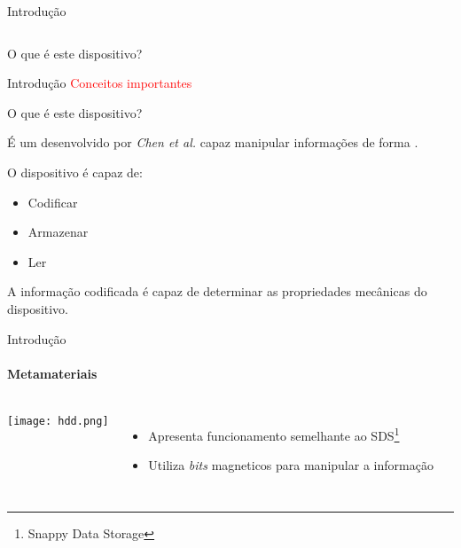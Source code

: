 \begin{frame}[t]{Introdução}
    \transboxout[duration=0.5]
    \begin{columns}
    \end{columns}

    \begin{block}{O que é este dispositivo?}
    \end{block}
\end{frame}

\begin{frame}[t]{Introdução}
    \transboxout[duration=0.5]
    \textcolor{red}{Conceitos importantes}

    \begin{block}{O que é este dispositivo?}

        É um  desenvolvido por \textit{Chen et al.} capaz manipular informações de forma \cite{coulais2021snappy}.
    \end{block}

    O dispositivo é capaz de:
    \begin{itemize}
        \item Codificar
        \item Armazenar
        \item Ler
    \end{itemize}

    A informação codificada é capaz de determinar as propriedades mecânicas do dispositivo.
    
\end{frame}


\begin{frame}[t]{Introdução}
    \transboxout[duration=0.5]
    \framesubtitle{Metamateriais}
    \begin{columns}
            \texttt{[image: hdd.png]}
            \begin{itemize}
                \item Apresenta funcionamento semelhante ao SDS\footnote{Snappy Data Storage}
                \item Utiliza \textit{bits} magneticos para manipular a informação
            
            \end{itemize}
    \end{columns}
   
\end{frame}



